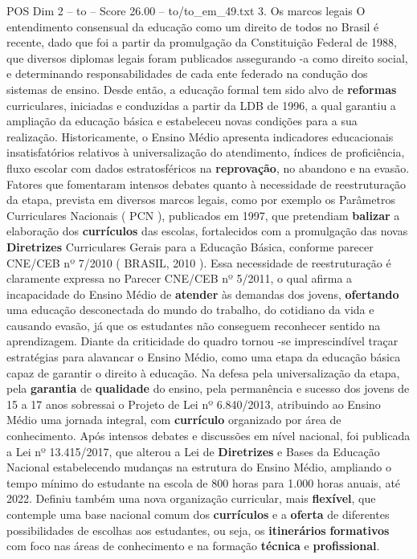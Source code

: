 \begin{textsample}{POS Dim 2 – to – Score 26.00 – to/to\_em\_49.txt}  \label{ex:f2_pos_133}
3.
Os marcos legais O entendimento consensual da educação como um direito de todos no Brasil é recente, dado que foi a partir da promulgação da Constituição Federal de 1988, que diversos diplomas legais foram publicados assegurando -a como direito social, e determinando responsabilidades de cada ente federado na condução dos sistemas de ensino.
Desde então, a educação formal tem sido alvo de \textbf{reformas} curriculares, iniciadas e conduzidas a partir da LDB de 1996, a qual garantiu a ampliação da educação básica e estabeleceu novas condições para a sua realização.
Historicamente, o Ensino Médio apresenta indicadores educacionais insatisfatórios relativos à universalização do atendimento, índices de proficiência, fluxo escolar com dados estratosféricos na \textbf{reprovação}, no abandono e na evasão.
Fatores que fomentaram intensos debates quanto à necessidade de reestruturação da etapa, prevista em diversos marcos legais, como por exemplo os Parâmetros Curriculares Nacionais ( PCN ), publicados em 1997, que pretendiam \textbf{balizar} a elaboração dos \textbf{currículos} das escolas, fortalecidos com a promulgação das novas \textbf{Diretrizes} Curriculares Gerais para a Educação Básica, conforme parecer CNE/CEB nº 7/2010 ( BRASIL, 2010 ).
Essa necessidade de reestruturação é claramente expressa no Parecer CNE/CEB nº 5/2011, o qual afirma a incapacidade do Ensino Médio de \textbf{atender} às demandas dos jovens, \textbf{ofertando} uma educação desconectada do mundo do trabalho, do cotidiano da vida e causando evasão, já que os estudantes não conseguem reconhecer sentido na aprendizagem.
Diante da criticidade do quadro tornou -se imprescindível traçar estratégias para alavancar o Ensino Médio, como uma etapa da educação básica capaz de garantir o direito à educação.
Na defesa pela universalização da etapa, pela \textbf{garantia} de \textbf{qualidade} do ensino, pela permanência e sucesso dos jovens de 15 a 17 anos sobressai o Projeto de Lei nº 6.840/2013, atribuindo ao Ensino Médio uma jornada integral, com \textbf{currículo} organizado por área de conhecimento.
Após intensos debates e discussões em nível nacional, foi publicada a Lei nº 13.415/2017, que alterou a Lei de \textbf{Diretrizes} e Bases da Educação Nacional estabelecendo mudanças na estrutura do Ensino Médio, ampliando o tempo mínimo do estudante na escola de 800 horas para 1.000 horas anuais, até 2022.
Definiu também uma nova organização curricular, mais \textbf{flexível}, que contemple uma base nacional comum dos \textbf{currículos} e a \textbf{oferta} de diferentes possibilidades de escolhas aos estudantes, ou seja, os \textbf{itinerários} \textbf{formativos} com foco nas áreas de conhecimento e na formação \textbf{técnica} e \textbf{profissional}.

\end{textsample}
